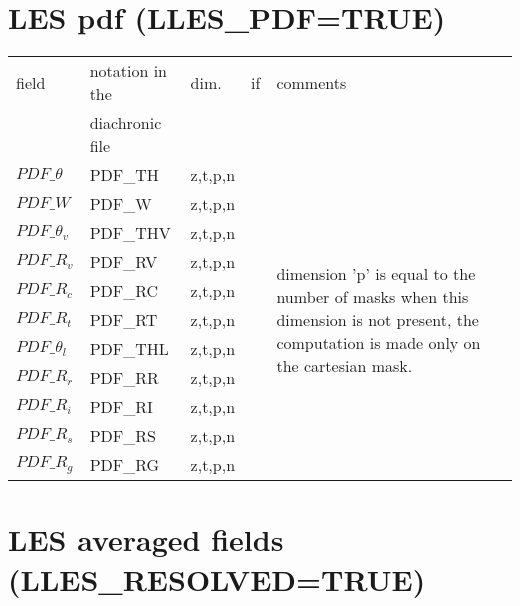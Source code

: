 \newpage
\section{LES pdf (LLES\_PDF=TRUE)}

\begin{center}
\begin{makeimage}
\begin{tabular}{||p{6cm}|>{\centering}p{2.5cm}|>{\centering}p{1.5cm}|>{\centering}p{0.5cm}|p{5cm }||}
\hline
\hline
field & notation in the & dim. & if    & comments \\
      & diachronic file & &  & \\
\hline
\hline
$PDF\_\theta$ & PDF\_TH & z,t,p,n & &\multirow{11}{5cm}{dimension 'p' is equal to the  number of masks when this dimension is not present, the computation is made only on the cartesian mask.} \\
\cline{1-4}
$PDF\_W$ & PDF\_W &z,t,p,n &   &  \\
\cline{1-4}
$PDF\_\theta_v$ & PDF\_THV &z,t,p,n &   & \\
\cline{1-4}
$PDF\_R_v$ & PDF\_RV &z,t,p,n &   &  \\
\cline{1-4}
$PDF\_R_c$ & PDF\_RC &z,t,p,n &   &\\
\cline{1-4}
$PDF\_R_t$ & PDF\_RT &z,t,p,n &   &\\
\cline{1-4}
$PDF\_\theta_l$ & PDF\_THL &z,t,p,n &   &\\
\cline{1-4}
$PDF\_R_r$ & PDF\_RR &z,t,p,n &   &\\
\cline{1-4}
$PDF\_R_i$ & PDF\_RI &z,t,p,n &   &\\
\cline{1-4}
$PDF\_R_s$ & PDF\_RS &z,t,p,n &   &\\
\cline{1-4}
$PDF\_R_g$ & PDF\_RG &z,t,p,n &   &\\
\hline
\hline
\end{tabular}
\end{makeimage}
\end{center}

\section{LES averaged fields (LLES\_RESOLVED=TRUE)}

